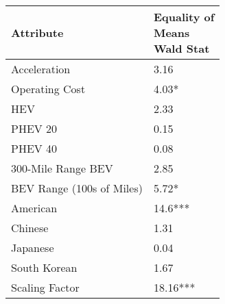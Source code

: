 \begin{tabular}{ll}
\toprule
                Attribute & \makecell{Equality of \\ Means \\ Wald Stat} \\
\midrule
             Acceleration &                        \multirow{1}{*}{3.16} \\
           Operating Cost &                       \multirow{1}{*}{4.03*} \\
                      HEV &                        \multirow{1}{*}{2.33} \\
                  PHEV 20 &                        \multirow{1}{*}{0.15} \\
                  PHEV 40 &                        \multirow{1}{*}{0.08} \\
       300-Mile Range BEV &                        \multirow{1}{*}{2.85} \\
BEV Range (100s of Miles) &                       \multirow{1}{*}{5.72*} \\
                 American &                     \multirow{1}{*}{14.6***} \\
                  Chinese &                        \multirow{1}{*}{1.31} \\
                 Japanese &                        \multirow{1}{*}{0.04} \\
             South Korean &                        \multirow{1}{*}{1.67} \\
           Scaling Factor &                    \multirow{1}{*}{18.16***} \\
\bottomrule
\end{tabular}
